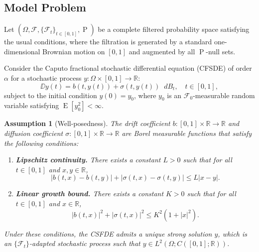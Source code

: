 \documentclass[11pt, a4paper]{article}
\theoremstyle{theoremstyle}
\theoremstyle{definitionstyle}
\newtheorem{assumption}[theorem]{Assumption}
\newcommand{\dd}{\mathop{}\!d}
\DeclareMathOperator{\PP}{\mathrm P}
\DeclareMathOperator{\EE}{\mathrm E}
\begin{document}

\subsection{Model Problem}\label{sec:model_prob}

Let \( (\Omega, \mathcal F, \{\mathcal F_t\}_{t \in [0,1]}, \PP) \) be a complete filtered probability space satisfying the usual conditions, where the filtration is generated by a standard one-dimensional Brownian motion on \([0, 1]\) and augmented by all \( \PP \)-null sets.

Consider the Caputo fractional stochastic differential equation (CFSDE) of order \( \alpha \) for a stochastic process \( y : \Omega \times [0, 1] \to \mathbb{R} \):
\begin{equation} \DD y(t) = b(t, y(t)) + \sigma(t, y(t))\dd{B_t}, \quad t \in [0, 1], \end{equation}
subject to the initial condition \( y(0) = y_0 \), where \( y_0 \) is an \( \mathcal F_0 \)-measurable random variable satisfying \( \EE [y_0^2] < \infty \).

\begin{assumption}[Well-posedness]\label{as:wp}
    The drift coefficient $b\colon [0,1] \times \mathbb{R} \to \mathbb{R}$ and diffusion coefficient $\sigma\colon [0,1] \times \mathbb{R} \to \mathbb{R}$ are Borel measurable functions that satisfy the following conditions:
    \begin{enumerate}
        \item \textbf{Lipschitz continuity.} There exists a constant $L > 0$ such that for all $t \in [0,1]$ and $x, y \in \mathbb{R}$,
        \begin{equation} |b(t,x) - b(t,y)| + |\sigma(t,x) - \sigma(t,y)| \leq L|x - y|. \end{equation}
        \item \textbf{Linear growth bound.} There exists a constant $K > 0$ such that for all $t \in [0,1]$ and $x \in \mathbb{R}$,
        \begin{equation} |b(t,x)|^2 + |\sigma(t,x)|^2 \leq K^2(1 + |x|^2). \end{equation}
    \end{enumerate}
    Under these conditions, the CSFDE admits a unique strong solution $y$, which is an $\{\mathcal{F}_t\}$-adapted stochastic process such that $y \in L^2(\Omega; C([0,1]; \mathbb{R}))$.
\end{assumption}
\end{document}
